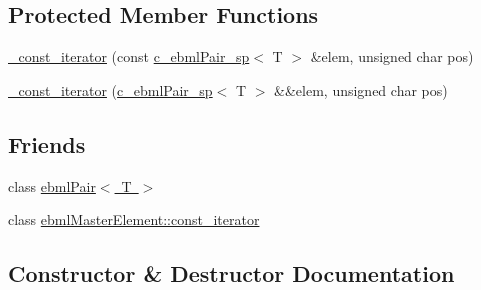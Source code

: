 \subsection*{Protected Member Functions}
\begin{DoxyCompactItemize}
\item 
\mbox{\hyperlink{classebml_1_1ebmlPair_1_1__const__iterator_af56c2752b5cc334ec40e380d6f5a3301}{\+\_\+const\+\_\+iterator}} (const \mbox{\hyperlink{namespaceebml_a9c804317d5b51ef8844bdffe5e8cb4b3}{c\+\_\+ebml\+Pair\+\_\+sp}}$<$ T $>$ \&elem, unsigned char pos)
\item 
\mbox{\hyperlink{classebml_1_1ebmlPair_1_1__const__iterator_a703a5a75fe4cd7809ab31cdd1b3cb54b}{\+\_\+const\+\_\+iterator}} (\mbox{\hyperlink{namespaceebml_a9c804317d5b51ef8844bdffe5e8cb4b3}{c\+\_\+ebml\+Pair\+\_\+sp}}$<$ T $>$ \&\&elem, unsigned char pos)
\end{DoxyCompactItemize}
\subsection*{Friends}
\begin{DoxyCompactItemize}
\item 
class \mbox{\hyperlink{classebml_1_1ebmlPair_1_1__const__iterator_ad1db4b5395f31070d1be2d251ee85e02}{ebml\+Pair$<$ T $>$}}
\item 
class \mbox{\hyperlink{classebml_1_1ebmlPair_1_1__const__iterator_a734affd0f736e2e4e03ab2cf8a9f9b26}{ebml\+Master\+Element\+::const\+\_\+iterator}}
\end{DoxyCompactItemize}


\subsection{Constructor \& Destructor Documentation}
\mbox{\label{classebml_1_1ebmlPair_1_1__const__iterator_af56c2752b5cc334ec40e380d6f5a3301}} 
